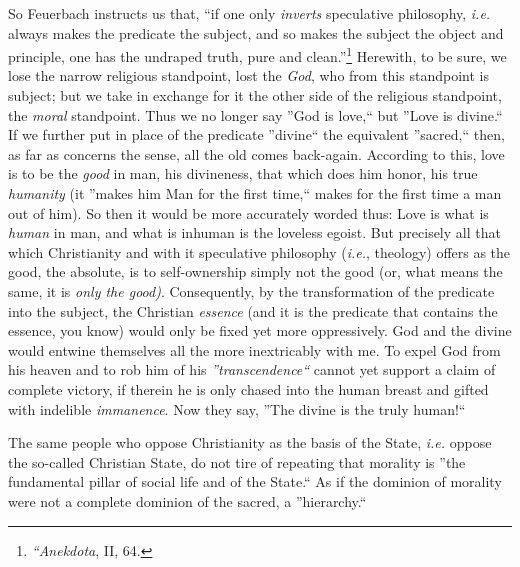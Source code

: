 \documentclass[12pt,a4paper]{book}
\begin{document}
So Feuerbach instructs us that, ``if one only \textit{inverts} speculative 
philosophy, \textit{i.e.} always makes the predicate the subject, and so makes 
the subject the object and principle, one has the undraped truth, pure and 
clean.''\footnote{\textit{``Anekdota}, II, 64.} Herewith, to be sure, we 
lose the narrow religious standpoint, lost the \textit{God}, who from this 
standpoint is subject; but we take in exchange for it the other side of the 
religious standpoint, the \textit{moral} standpoint. Thus we no longer say 
''God is love,`` but ''Love is divine.`` If we further put in place of the 
predicate ''divine`` the equivalent ''sacred,`` then, as far as concerns 
the sense, all the old comes back-again. According to this, love is to be the 
\textit{good} in man, his divineness, that which does him honor, his true 
\textit{humanity} (it ''makes him Man for the first time,`` makes for the 
first time a man out of him). So then it would be more accurately worded thus: 
Love is what is \textit{human} in man, and what is inhuman is the loveless 
egoist. But precisely all that which Christianity and with it speculative 
philosophy (\textit{i.e.}, theology) offers as the good, the absolute, is to 
self-ownership simply not the good (or, what means the same, it is 
\textit{only the good)}. Consequently, by the transformation of the predicate 
into the subject, the Christian \textit{essence} (and it is the predicate that 
contains the essence, you know) would only be fixed yet more oppressively. God 
and the divine would entwine themselves all the more inextricably with me. To 
expel God from his heaven and to rob him of his \textit{''transcendence``} 
cannot yet support a claim of complete victory, if therein he is only chased 
into the human breast and gifted with indelible \textit{immanence}. Now they 
say, ''The divine is the truly human!``

The same people who oppose Christianity as the basis of the State, 
\textit{i.e.} oppose the so-called Christian State, do not tire of repeating 
that morality is ''the fundamental pillar of social life and of the State.`` 
As if the dominion of morality were not a complete dominion of the sacred, a 
''hierarchy.``
\end{document}
